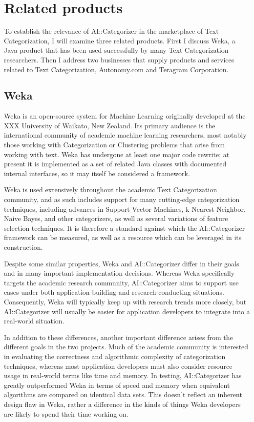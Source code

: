 \documentclass[a4paper]{report}
\begin{document}
\section{Related products}

To establish the relevance of AI::Categorizer in the marketplace of
Text Categorization, I will examine three related products.  First I
discuss Weka, a Java product that has been used successfully by many
Text Categorization researchers.  Then I address two businesses that
supply products and services related to Text Categorization,
Autonomy.com and Teragram Corporation.

\subsection{Weka}

Weka is an open-source system for Machine Learning originally
developed at the XXX University of Waikato, New Zealand.  Its primary
audience is the international community of academic machine learning
researchers, most notably those working with Categorization or
Clustering problems that arise from working with text.  Weka has
undergone at least one major code rewrite; at present it is
implemented as a set of related Java classes with documented internal
interfaces, so it may itself be considered a framework.

Weka is used extensively throughout the academic Text Categorization
community, and as such includes support for many cutting-edge
categorization techniques, including advances in Support Vector
Machines, k-Nearest-Neighbor, Naive Bayes, and other categorizers, as
well as several variations of feature selection techniques.  It is
therefore a standard against which the AI::Categorizer framework can
be measured, as well as a resource which can be leveraged in its
construction.

Despite some similar properties, Weka and AI::Categorizer differ in
their goals and in many important implementation decisions.  Whereas
Weka specifically targets the academic research community,
AI::Categorizer aims to support use cases under both
application-building and research-conducting situations.
Consequently, Weka will typically keep up with research trends more
closely, but AI::Categorizer will usually be easier for application
developers to integrate into a real-world situation.

In addition to these differences, another important difference arises
from the different goals in the two projects.  Much of the academic
community is interested in evaluating the correctness and algorithmic
complexity of categorization techniques, whereas most application
developers must also consider resource usage in real-world terms like
time and memory.  In testing, AI::Categorizer has greatly outperformed
Weka in terms of speed and memory when equivalent algorithms are
compared on identical data sets.  This doesn't reflect an inherent
design flaw in Weka, rather a difference in the kinds of things Weka
developers are likely to spend their time working on.
\end{document}
